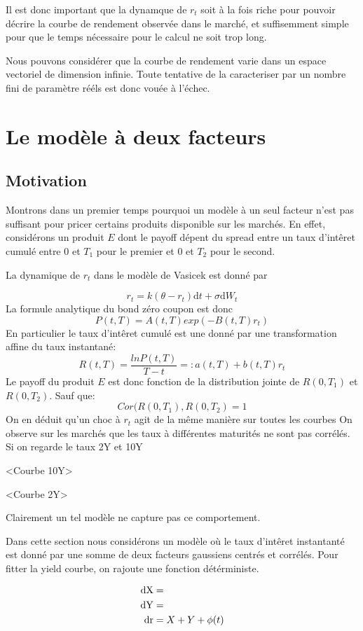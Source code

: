 \documentclass[paper=a4, fontsize=11pt]{scrartcl}
\numberwithin{equation}{section}		%
\numberwithin{figure}{section}			%
\numberwithin{table}{section}				%
\begin{document}
Il est donc important que la dynamque de $r_t$ soit à la fois riche pour pouvoir décrire la courbe de rendement observée dans le marché, et suffisemment simple pour que le temps nécessaire pour le calcul ne soit trop long.

Nous pouvons considérer que la courbe de rendement varie dans un espace vectoriel de dimension infinie. Toute tentative de la caracteriser par un nombre fini de paramètre rééls est donc vouée à l'échec.


\section{Le modèle à deux facteurs}
\subsection{Motivation}



Montrons dans un premier temps pourquoi un modèle à un seul facteur n'est pas suffisant pour pricer certains produits disponible sur les marchés. En effet, considérons un produit $E$ dont le payoff  dépent  du spread entre un taux d'intêret cumulé entre $0$ et $T_1$ pour le premier et $0$ et $T_2$ pour le second.

La dynamique de $r_t$ dans le modèle de Vasicek est donné par

$$r_t = k(\theta - r_t)  \mathrm{d}t  + \sigma \mathrm{d}W_t$$
La formule analytique du bond zéro coupon est donc
$$P(t, T) = A(t, T) exp(-B(t, T) r_t)$$
En particulier le taux d'intêret cumulé est une donné par une transformation affine du taux instantané:
$$R(t, T) = \frac{ln P(t, T)}{T-t} =: a(t, T) + b(t, T) r_t$$
Le payoff du produit $E$ est donc fonction de la distribution jointe de $R(0, T_1)$ et $R(0, T_2)$. Sauf que:
$$Cor(R(0, T_1), R(0, T_2) = 1$$
On en déduit qu'un choc à $r_t$ agit de la même manière sur toutes les courbes
On observe sur les marchés que les taux à différentes maturités ne sont pas corrélés. Si on regarde le taux 2Y et 10Y

<Courbe 10Y> 

<Courbe 2Y>

Clairement un tel modèle ne capture pas ce comportement.

Dans cette section nous considérons un modèle où le taux d'intêret instantanté est donné par une somme de deux facteurs gaussiens centrés et corrélés. Pour fitter la yield courbe, on rajoute une fonction détérministe.

\begin{align*}
  \rm{d}X &= \\
  \rm{d}Y &= \\
  \rm{d} r &= X + Y + \phi(t)
\end{align*}
\end{document}

